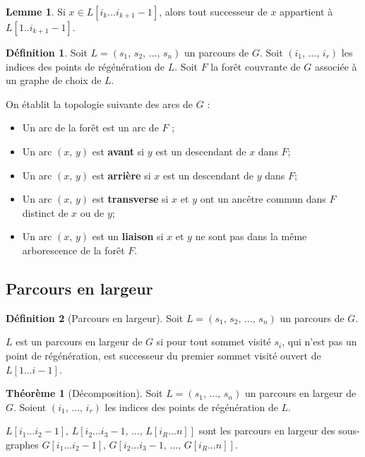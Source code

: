 \documentclass[11pt,english,french]{scrreprt}
\theoremstyle{remark}
\theoremstyle{definition}
\newtheorem*{def*}{Définition}
\newtheorem*{lem*}{Lemme}
\newtheorem*{thm*}{Théorème}
\begin{document}
\begin{lem*}
	Si $x\in L[i_k\dots i_{k+1}-1]$, alors tout successeur de $x$ appartient à $L[1..i_{k+1}-1]$.
\end{lem*}

\begin{def*}

	Soit $L=(s_1,\,s_2,\,\dots,\,s_n)$ un parcours de $G$. Soit $(i_1,\,\dots ,\,i_r)$ les indices des points de régénération de $L$. Soit $F$ la forêt couvrante de $G$ associée à un graphe de choix de $L$.
	
	On établit la topologie suivante des arcs de $G$ :\begin{itemize}
		\item Un arc de la forêt est un arc de $F$ ;
		\item Un arc $(x,\,y)$ est \textbf{avant} si $y$ est un descendant de $x$ dans $F$;
		\item Un arc $(x,\,y)$ est \textbf{arrière} si $x$ est un descendant de $y$ dans $F$;
		\item Un arc $(x,\,y)$ est \textbf{transverse} si $x$ et $y$ ont un ancêtre commun dans $F$ distinct de $x$ ou de $y$;
		\item Un arc $(x,\,y)$ est un \textbf{liaison} si $x$ et $y$ ne sont pas dans la même arborescence de la forêt $F$.
	\end{itemize}
\end{def*}

\subsection{Parcours en largeur} %

\begin{def*}[Parcours en largeur]
	Soit $L=(s_1,\,s_2,\,\dots,\,s_n)$ un parcours de $G$.
	
	$L$ est un parcours en largeur de $G$ si pour tout sommet visité $s_i$, qui n'est pas un point de régénération, est successeur du premier sommet visité ouvert de $L[1\dots i-1]$.
\end{def*}

\begin{thm*}[Décomposition]
	Soit $L=(s_1,\,\dots,\,s_n)$ un parcours en largeur de $G$. Soient $(i_1,\,\dots,\,i_r)$ les indices des points de régénération de $L$.
	
	$L[i_1\dots i_2-1],\,L[i_2\dots i_3-1,\,\dots,\,L[i_R\dots n]]$ sont les parcours en largeur des sous-graphes 	$G[i_1\dots i_2-1],\,G[i_2\dots i_3-1,\,\dots,\,G[i_R\dots n]]$.
\end{thm*}
\end{document}
